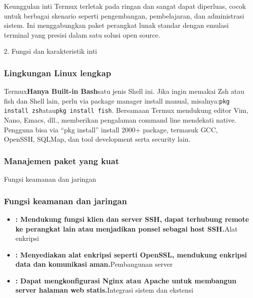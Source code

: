 


Keunggulan inti Termux terletak pada ringan dan sangat dapat diperluas, cocok untuk berbagai skenario seperti pengembangan, pembelajaran, dan administrasi sistem. Ini menggabungkan paket perangkat lunak standar dengan emulasi terminal yang presisi dalam satu solusi open source.

2. Fungsi dan karakteristik inti


\subsubsection*{Lingkungan Linux lengkap}

Termux\textbf{Hanya Built-in Bash}satu jenis Shell ini. Jika ingin memakai Zsh atau fish dan Shell lain, perlu via package manager install manual, misalnya:\texttt{pkg install zsh}atau\texttt{pkg install fish}. Bersamaan Termux mendukung editor Vim, Nano, Emacs, dll., memberikan pengalaman command line mendekati native. Pengguna bisa via “pkg install” install 2000+ package, termasuk GCC, OpenSSH, SQLMap, dan tool development serta security lain.

\subsubsection*{Manajemen paket yang kuat}

Fungsi keamanan dan jaringan

\subsubsection*{Fungsi keamanan dan jaringan}

\begin{itemize}
  \item \textbf{: Mendukung fungsi klien dan server SSH, dapat terhubung remote ke perangkat lain atau menjadikan ponsel sebagai host SSH.}Alat enkripsi
  \item \textbf{: Menyediakan alat enkripsi seperti OpenSSL, mendukung enkripsi data dan komunikasi aman.}Pembangunan server
  \item \textbf{: Dapat mengkonfigurasi Nginx atau Apache untuk membangun server halaman web statis.}Integrasi sistem dan ekstensi
\end{itemize}

